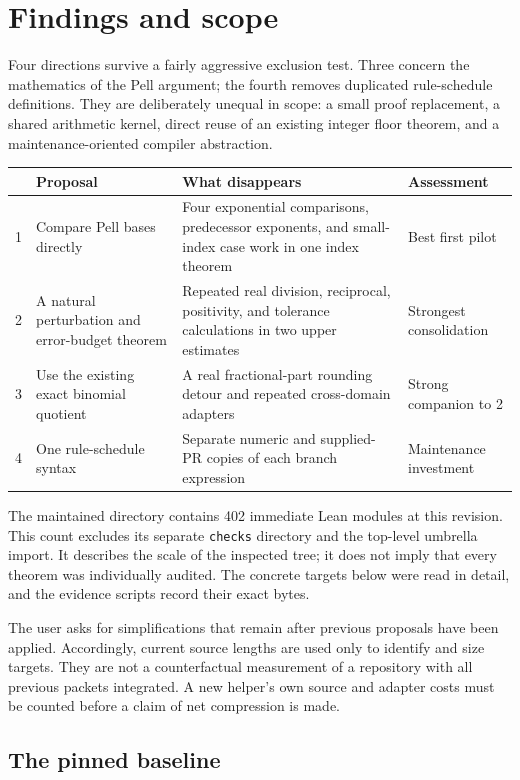 \documentclass[11pt,a4paper]{article}
\newcommand{\code}[1]{\nolinkurl{#1}}
\begin{document}
\section{Findings and scope}

Four directions survive a fairly aggressive exclusion test. Three concern the
mathematics of the Pell argument; the fourth removes duplicated rule-schedule
definitions. They are deliberately unequal in scope: a small proof replacement,
a shared arithmetic kernel, direct reuse of an existing integer floor theorem, and
a maintenance-oriented compiler abstraction.

\begin{tabularx}{\textwidth}{@{}P{7mm}P{40mm}YP{31mm}@{}}
\toprule
 & Proposal & What disappears & Assessment\\
 & Compare Pell bases directly & Four exponential comparisons, predecessor exponents, and small-index case work in one index theorem & Best first pilot\\
2 & A natural perturbation and error-budget theorem & Repeated real division, reciprocal, positivity, and tolerance calculations in two upper estimates & Strongest consolidation\\
3 & Use the existing exact binomial quotient & A real fractional-part rounding detour and repeated cross-domain adapters & Strong companion to 2\\
4 & One rule-schedule syntax & Separate numeric and supplied-PR copies of each branch expression & Maintenance investment\\
\bottomrule
\end{tabularx}

The maintained directory contains 402 immediate Lean modules at this revision.
This count excludes its separate \code{checks} directory and the top-level
umbrella import. It describes the scale of the inspected tree; it does not imply
that every theorem was individually audited. The concrete targets below were
read in detail, and the evidence scripts record their exact bytes.

The user asks for simplifications that remain after previous proposals have
been applied. Accordingly, current source lengths are used only to identify
and size targets. They are not a counterfactual measurement of a repository
with all previous packets integrated. A new helper's own source and adapter
costs must be counted before a claim of net compression is made.

\subsection{The pinned baseline}
\end{document}
